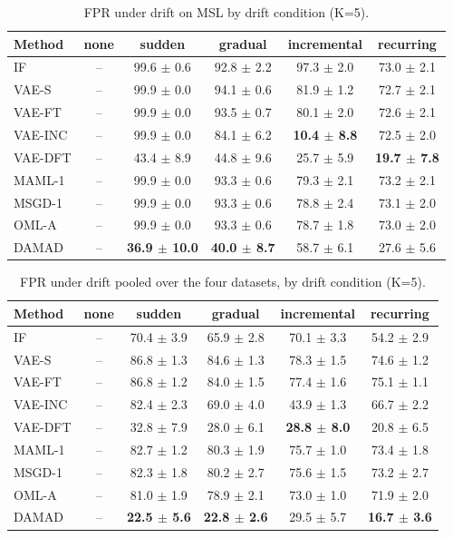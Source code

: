 \begin{table}[t]
\centering
\small
\caption{FPR under drift on MSL by drift condition (K=5).}
\label{tab:drift_fpr_drift_msl}
\begin{tabular}{lccccc}
\toprule
Method & none & sudden & gradual & incremental & recurring \\
\midrule
IF & – & 99.6 $\pm$ 0.6 & 92.8 $\pm$ 2.2 & 97.3 $\pm$ 2.0 & 73.0 $\pm$ 2.1 \\
VAE-S & – & 99.9 $\pm$ 0.0 & 94.1 $\pm$ 0.6 & 81.9 $\pm$ 1.2 & 72.7 $\pm$ 2.1 \\
VAE-FT & – & 99.9 $\pm$ 0.0 & 93.5 $\pm$ 0.7 & 80.1 $\pm$ 2.0 & 72.6 $\pm$ 2.1 \\
VAE-INC & – & 99.9 $\pm$ 0.0 & 84.1 $\pm$ 6.2 & \textbf{10.4 $\pm$ 8.8} & 72.5 $\pm$ 2.0 \\
VAE-DFT & – & 43.4 $\pm$ 8.9 & 44.8 $\pm$ 9.6 & 25.7 $\pm$ 5.9 & \textbf{19.7 $\pm$ 7.8} \\
MAML-1 & – & 99.9 $\pm$ 0.0 & 93.3 $\pm$ 0.6 & 79.3 $\pm$ 2.1 & 73.2 $\pm$ 2.1 \\
MSGD-1 & – & 99.9 $\pm$ 0.0 & 93.3 $\pm$ 0.6 & 78.8 $\pm$ 2.4 & 73.1 $\pm$ 2.0 \\
OML-A & – & 99.9 $\pm$ 0.0 & 93.3 $\pm$ 0.6 & 78.7 $\pm$ 1.8 & 73.0 $\pm$ 2.0 \\
DAMAD & – & \textbf{36.9 $\pm$ 10.0} & \textbf{40.0 $\pm$ 8.7} & 58.7 $\pm$ 6.1 & 27.6 $\pm$ 5.6 \\
\bottomrule
\end{tabular}
\end{table}

\begin{table}[t]
\centering
\small
\caption{FPR under drift pooled over the four datasets, by drift condition (K=5).}
\label{tab:drift_fpr_drift_all}
\begin{tabular}{lccccc}
\toprule
Method & none & sudden & gradual & incremental & recurring \\
\midrule
IF & – & 70.4 $\pm$ 3.9 & 65.9 $\pm$ 2.8 & 70.1 $\pm$ 3.3 & 54.2 $\pm$ 2.9 \\
VAE-S & – & 86.8 $\pm$ 1.3 & 84.6 $\pm$ 1.3 & 78.3 $\pm$ 1.5 & 74.6 $\pm$ 1.2 \\
VAE-FT & – & 86.8 $\pm$ 1.2 & 84.0 $\pm$ 1.5 & 77.4 $\pm$ 1.6 & 75.1 $\pm$ 1.1 \\
VAE-INC & – & 82.4 $\pm$ 2.3 & 69.0 $\pm$ 4.0 & 43.9 $\pm$ 1.3 & 66.7 $\pm$ 2.2 \\
VAE-DFT & – & 32.8 $\pm$ 7.9 & 28.0 $\pm$ 6.1 & \textbf{28.8 $\pm$ 8.0} & 20.8 $\pm$ 6.5 \\
MAML-1 & – & 82.7 $\pm$ 1.2 & 80.3 $\pm$ 1.9 & 75.7 $\pm$ 1.0 & 73.4 $\pm$ 1.8 \\
MSGD-1 & – & 82.3 $\pm$ 1.8 & 80.2 $\pm$ 2.7 & 75.6 $\pm$ 1.5 & 73.2 $\pm$ 2.7 \\
OML-A & – & 81.0 $\pm$ 1.9 & 78.9 $\pm$ 2.1 & 73.0 $\pm$ 1.0 & 71.9 $\pm$ 2.0 \\
DAMAD & – & \textbf{22.5 $\pm$ 5.6} & \textbf{22.8 $\pm$ 2.6} & 29.5 $\pm$ 5.7 & \textbf{16.7 $\pm$ 3.6} \\
\bottomrule
\end{tabular}
\end{table}


